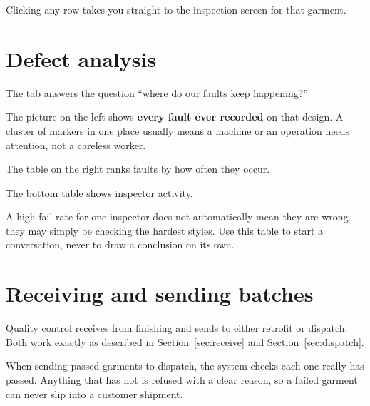 Clicking any row takes you straight to the inspection screen for that garment.

\section{Defect analysis}

The  tab answers the question ``where do our faults keep
happening?''


\begin{bullets}
  \item The picture on the left shows \textbf{every fault ever recorded} on that
        design. A cluster of markers in one place usually means a machine or an
        operation needs attention, not a careless worker.
  \item The table on the right ranks faults by how often they occur.
  \item The bottom table shows inspector activity.
\end{bullets}

\begin{plainwords}
A high fail rate for one inspector does not automatically mean they are wrong ---
they may simply be checking the hardest styles. Use this table to start a
conversation, never to draw a conclusion on its own.
\end{plainwords}

\section{Receiving and sending batches}

Quality control receives from finishing and sends to either retrofit or dispatch.
Both work exactly as described in Section~\ref{sec:receive}
and Section~\ref{sec:dispatch}.

\begin{tipbox}
When sending passed garments to dispatch, the system checks each one really has
passed. Anything that has not is refused with a clear reason, so a failed garment
can never slip into a customer shipment.
\end{tipbox}
